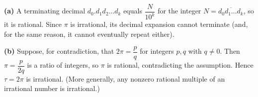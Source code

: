 \textbf{(a)} A terminating decimal $d_0.d_1d_2\dots d_k$ equals $\dfrac{N}{10^k}$ for the integer $N=\overline{d_0d_1\dots d_k}$, so it is rational. Since $\pi$ is irrational, its decimal expansion cannot terminate (and, for the same reason, it cannot eventually repeat either).

\textbf{(b)} Suppose, for contradiction, that $2\pi=\dfrac{p}{q}$ for integers $p,q$ with $q\ne0$. Then $\pi=\dfrac{p}{2q}$ is a ratio of integers, so $\pi$ is rational, contradicting the assumption. Hence $\tau=2\pi$ is irrational. (More generally, any nonzero rational multiple of an irrational number is irrational.)
